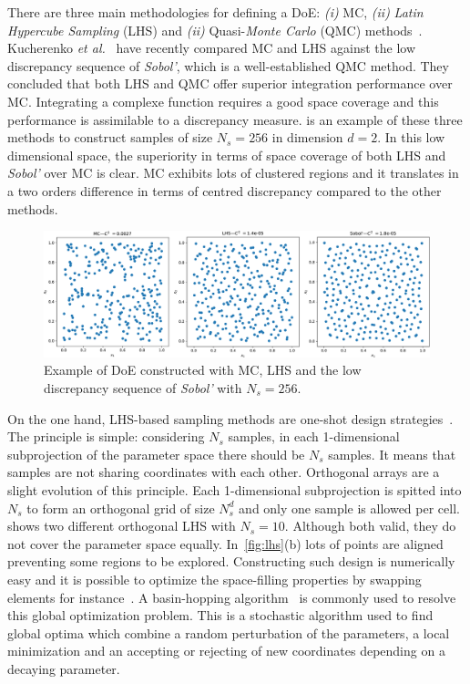 There are three main methodologies for defining a DoE: \emph{(i)} MC, \emph{(ii)} \emph{Latin Hypercube Sampling} (LHS) and \emph{(ii)} Quasi-\emph{Monte Carlo} (QMC) methods~\citep{Cavazzuti2013,Garud2017}. Kucherenko \emph{et al.}~\citep{Kucherenko2015} have recently compared MC and LHS against the low discrepancy sequence of \emph{Sobol'}, which is a well-established QMC method. They concluded that both LHS and QMC offer superior integration performance over MC. Integrating a complexe function requires a good space coverage and this performance is assimilable to a discrepancy measure.  is an example of these three methods to construct samples of size $N_s = 256$ in dimension $d = 2$. In this low dimensional space, the superiority in terms of space coverage of both LHS and \emph{Sobol'} over MC is clear. MC exhibits lots of clustered regions and it translates in a two orders difference in terms of centred discrepancy compared to the other methods.

\begin{figure}[!ht]
\centering
\includegraphics[width=\linewidth,keepaspectratio]{fig/literature/doe_examples.pdf}
\caption{Example of DoE constructed with MC, LHS and the low discrepancy sequence of \emph{Sobol'}  with $N_s=256$.}
\label{fig:ex_doe}
\end{figure}

On the one hand, LHS-based sampling methods are one-shot design strategies~\citep{Mckay1979,Fang2006}. The principle is simple: considering $N_s$ samples, in each 1-dimensional subprojection of the parameter space there should be $N_s$ samples. It means that samples are not sharing coordinates with each other. Orthogonal arrays are a slight evolution of this principle. Each 1-dimensional subprojection is spitted into $N_s$ to form an orthogonal grid of size $N_s^d$ and only one sample is allowed per cell.  shows two different orthogonal LHS with $N_s=10$. Although both valid, they do not cover the parameter space equally. In~\cref{fig:lhs}(b) lots of points are aligned preventing some regions to be explored. Constructing such design is numerically easy and it is possible to optimize the space-filling properties by swapping elements for instance~\cite{Fang2006,Damblin2013}. A basin-hopping algorithm~\cite{wales1997} is commonly used to resolve this global optimization problem. This is a stochastic algorithm used to find global optima which combine a random perturbation of the parameters, a local minimization and an accepting or rejecting of new coordinates depending on a decaying parameter.

